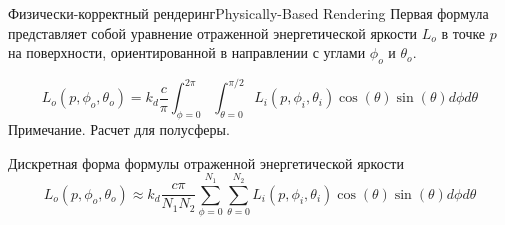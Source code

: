 \documentclass{beamer}
\begin{document}
	\begin{frame}{Физически-корректный рендеринг}{Physically-Based Rendering}
		Первая формула представляет собой уравнение отраженной энергетической яркости $L_o$ в точке $p$ на поверхности, ориентированной в направлении с углами $\phi_o$ и $\theta_o$.

		\[
			L_o(p,\phi_o,\theta_o) = k_d \frac{c}{\pi}
			\int_{\phi=0}^{2\pi} \int_{\theta=0}^{\pi / 2}
			L_i(p, \phi_i, \theta_i) \cos(\theta) \sin(\theta) d\phi d\theta
		\]
			Примечание. Расчет для полусферы.
			
			Дискретная форма формулы отраженной энергетической яркости
	\[
		L_o(p,\phi_o,\theta_o) \approx k_d \frac{c \pi}{N_1 N_2}
		\sum_{\phi=0}^{N_1} \sum_{\theta=0}^{N_2}
		L_i(p, \phi_i, \theta_i) \cos(\theta) \sin(\theta) d\phi d\theta
	\]
	\end{frame}
	
\end{document}
